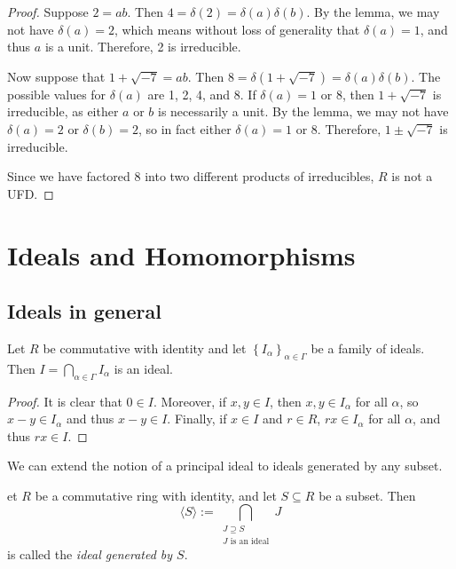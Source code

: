 \documentclass[english,course]{lecture}
\theoremstyle{plain}
\newenvironment{definition}[1]
  {\renewcommand\theinnerdefinition{#1}\innerdefinition}
  {\endinnerdefinition}
\def\set#1{\left\{ {#1} \right\}}
\def\presnotes{}
\begin{document}
\begin{proof}
	Suppose $2 = ab$.
	Then $4 = \delta(2) = \delta(a)\delta(b)$.
	By the lemma, we may not have $\delta(a) = 2$, which means without loss of generality that $\delta(a) = 1$, and thus $a$ is a unit.
	Therefore, 2 is irreducible.
	
	Now suppose that $1 + \sqrt{-7} = ab$.
	Then $8 = \delta(1+\sqrt{-7}) = \delta(a) \delta(b)$.
	The possible values for $\delta(a)$ are 1, 2, 4, and 8.
	If $\delta(a) = 1$ or 8, then $1+\sqrt{-7}$ is irreducible, as either $a$ or $b$ is necessarily a unit.
	By the lemma, we may not have $\delta(a) = 2$ or $\delta(b) = 2$, so in fact either $\delta(a) = 1$ or 8.
	Therefore, $1\pm \sqrt{-7}$ is irreducible.
	
	Since we have factored 8 into two different products of irreducibles, $R$ is not a UFD.
\end{proof}

\presnotes

\clearpage

\section{Ideals and Homomorphisms}\label{sec:ideals}


\subsection{Ideals in general}


\begin{theorem}
	Let $R$ be commutative with identity and let $\set{I_{\alpha}}_{\alpha\in \Gamma}$ be a family of ideals.
	Then $I = \bigcap\limits_{\alpha\in \Gamma} I_\alpha$ is an ideal.
\end{theorem}

\begin{proof}
	It is clear that $0\in I$.
	Moreover, if $x,y\in I$, then $x,y\in I_\alpha$ for all $\alpha$, so $x-y\in I_\alpha$ and thus $x-y\in I$.
	Finally, if $x\in I$ and $r\in R$, $rx\in I_\alpha$ for all $\alpha$, and thus $rx\in I$.
\end{proof}


We can extend the notion of a principal ideal to ideals generated by any subset.

\begin{definition}
	Let $R$ be a commutative ring with identity, and let $S\subseteq R$ be a subset.
	Then
	\begin{equation}\label{eq:idealgeneratedbyset}
		\langle S \rangle := \bigcap\limits_{\substack{J\supseteq S\\\text{$J$ is an ideal}}} J
	\end{equation}
	is called the \emph{ideal generated by $S$}.
\end{definition}
\end{document}
